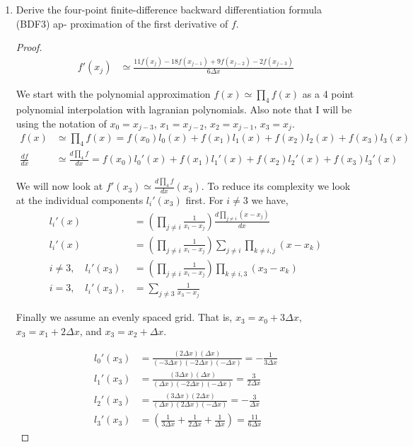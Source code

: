 \documentclass{article}
\begin{document}
\begin{enumerate}

    \item Derive the four-point finite-difference backward differentiation formula (BDF3) ap-
proximation of the first derivative of $f$. 
    \begin{proof}
        \begin{align}
            f'(x_j) &\simeq \frac{11f(x_j) - 18f(x_{j-1}) + 9f(x_{j-2}) - 2f(x_{j-3})}{6\Delta x}
        \end{align}

    We start with the polynomial approximation $f(x) \simeq \prod_4f(x)$ as a 4 point polynomial interpolation with lagranian polynomials. Also note that I will be using the notation of $x_0 = x_{j-3}$, $ x_1 = x_{j-2}$, $x_2 = x_{j-1}$, $x_3 = x_j$. 
        \begin{align}
            f(x) &\simeq \prod_4f(x) = f(x_0) l_0(x) + f(x_1) l_1(x) + f(x_2) l_2(x) + f(x_3)l_3(x) \\
            \frac{df}{dx} &\simeq \frac{d\prod_4f}{dx} = f(x_0) l_0'(x) + f(x_1) l_1'(x) + f(x_2) l_2'(x) + f(x_3)l_3'(x)
        \end{align}

        We will now look at $f'(x_3) \simeq \frac{d\prod_4f}{dx}(x_3)$. To reduce its complexity we look at the individual components $l_i'(x_3)$ first. For $i \neq 3$ we have, 
        \begin{align}
            l_i'(x) &= \left(\prod_{j \neq i}\frac{1}{x_i - x_j}\right)\frac{d \prod_{j \neq i}(x - x_j)}{dx} \\
            l_i'(x) &= \left(\prod_{j \neq i}\frac{1}{x_i - x_j}\right) \sum_{j\neq i}\prod_{k \neq i, j} (x - x_k) \\
            i \neq 3, \quad l_i'(x_3) &= \left(\prod_{j \neq i}\frac{1}{x_i - x_j}\right) \prod_{k \neq i, 3} (x_3 - x_k) \\
            i = 3, \quad l_i'(x_3),  &= \sum_{j \neq 3} \frac{1}{x_3 - x_j}
        \end{align}

        Finally we assume an evenly spaced grid. That is, $x_3 = x_0 + 3\Delta x$, $x_3 = x_1 + 2\Delta x$, and $x_3 = x_2 + \Delta x$. 

        \begin{align}
            l_0'(x_3) &= \frac{(2\Delta x)(\Delta x)}{(-3\Delta x)(-2\Delta x)(-\Delta x)} = -\frac{1}{3\Delta x} \\
            l_1'(x_3) &= \frac{(3\Delta x)(\Delta x)}{(\Delta x)(-2\Delta x)(-\Delta x)} = \frac{3}{2\Delta x}\\
            l_2'(x_3) &= \frac{(3\Delta x)(2\Delta x)}{(\Delta x)(2\Delta x)(-\Delta x)} = -\frac{3}{\Delta x}\\
            l_3'(x_3) &= \left(\frac{1}{3\Delta x} + \frac{1}{2\Delta x} + \frac{1}{\Delta x}\right) = \frac{11}{6\Delta x}
        \end{align}


\end{proof}
\end{enumerate}
\end{document}
